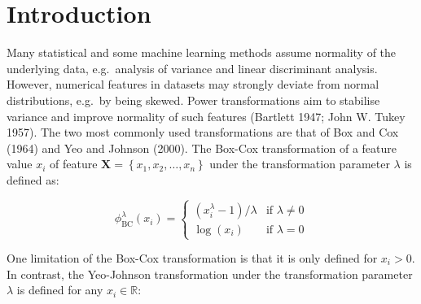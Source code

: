 \documentclass[preprint,12pt,authoryear]{elsarticle}
\begin{document}
\begin{frontmatter}
\begin{keyword}




\end{keyword}

\end{frontmatter}


\section{Introduction}\label{introduction}

Many statistical and some machine learning methods assume normality of
the underlying data, e.g.~analysis of variance and linear discriminant
analysis. However, numerical features in datasets may strongly deviate
from normal distributions, e.g.~by being skewed. Power transformations
aim to stabilise variance and improve normality of such features
(Bartlett 1947; John W. Tukey 1957). The two most commonly used
transformations are that of Box and Cox (1964) and Yeo and Johnson
(2000). The Box-Cox transformation of a feature value \(x_i\) of feature
\(\mathbf{X}=\left\{x_1, x_2, \ldots, x_n \right\}\) under the
transformation parameter \(\lambda\) is defined as:

\begin{equation}
\label{eqn:box-cox-original}
\phi_{\text{BC}}^\lambda (x_i) = 
\begin{cases}
\left(x_i^\lambda - 1 \right) / \lambda & \text{if } \lambda \neq 0\\
\log(x_i) & \text{if } \lambda = 0
\end{cases}
\end{equation}

One limitation of the Box-Cox transformation is that it is only defined
for \(x_i > 0\). In contrast, the Yeo-Johnson transformation under the
transformation parameter \(\lambda\) is defined for any
\(x_i \in \mathbb{R}\):
\end{document}
